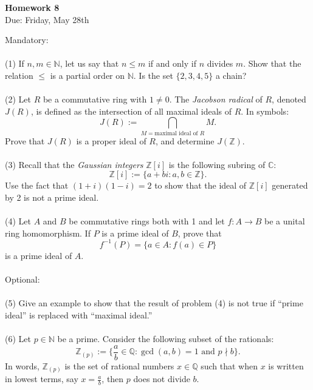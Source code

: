 \documentclass[12pt,twoside,a4paper]{article}
\theoremstyle{definition}
\theoremstyle{definition}
\newcommand{\N}{\mathbb{N}}								%
\newcommand{\Z}{\mathbb{Z}}
\newcommand{\Q}{\mathbb{Q}}
\newcommand{\C}{\mathbb{C}}
\newcommand{\ndivides}{\nmid}
\newcommand{\set}[1]{\{#1\}}
\begin{document}
	
\begin{center}
	\textbf{Homework 8}\\
	Due: Friday, May 28th
\end{center}

\noindent Mandatory:\\
\\
(1) If $n,m\in\N$, let us say that $n\leq m$ if and only if $n$ divides $m$. Show that the relation $\leq$ is a partial order on $\N$. Is the set $\set{2,3,4,5}$ a chain?\\
\\
(2) Let $R$ be a commutative ring with $1\neq 0$. The \textit{Jacobson radical} of $R$, denoted $J(R)$, is defined as the intersection of all maximal ideals of $R$. In symbols:
\begin{equation*}
	J(R):=\bigcap_{M=\text{maximal ideal of }R} M.
\end{equation*}
Prove that $J(R)$ is a proper ideal of $R$, and determine $J(\Z)$.\\
\\
(3) Recall that the \textit{Gaussian integers} $\Z[i]$ is the following subring of $\C$:
\begin{equation*}
	\Z[i]:=\set{a+bi:a,b\in\Z}.
\end{equation*}
Use the fact that $(1+i)(1-i)=2$ to show that the ideal of $\Z[i]$ generated by 2 is not a prime ideal.\\
\\
(4) Let $A$ and $B$ be commutative rings both with 1 and let $f:A\to B$ be a unital ring homomorphism. If $P$ is a prime ideal of $B$, prove that
\begin{equation*}
	f^{-1}(P)=\set{a\in A:f(a)\in P}
\end{equation*}
is a prime ideal of $A$.\\
\\
Optional:\\
\\
(5) Give an example to show that the result of problem (4) is not true if ``prime ideal'' is replaced with ``maximal ideal.''\\
\\
(6) Let $p\in\N$ be a prime. Consider the following subset of the rationals:
\begin{equation*}
	\Z_{(p)}:=\set{\frac{a}{b}\in\Q:\gcd(a,b)=1\text{ and }p\ndivides b}.
\end{equation*}
In words, $\Z_{(p)}$ is the set of rational numbers $x\in\Q$ such that when $x$ is written in lowest terms, say $x=\frac{a}{b}$, then $p$ does not divide $b$.\\
\end{document}
